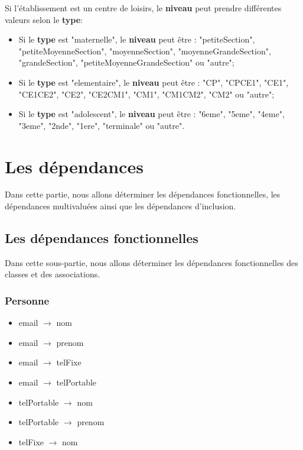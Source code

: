 \documentclass[asi, sansVersion]{picInsa}
\begin{document}
Si l'établissement est un centre de loisirs, le \textbf{niveau} peut prendre différentes valeurs selon le \textbf{type}:
\begin{itemize}
\item Si le \textbf{type} est "maternelle", le \textbf{niveau} peut être : "petiteSection", "petiteMoyenneSection", "moyenneSection", "moyenneGrandeSection", "grandeSection", "petiteMoyenneGrandeSection" ou "autre";
\item Si le \textbf{type} est "elementaire", le \textbf{niveau} peut être : "CP", "CPCE1", "CE1", "CE1CE2", "CE2", "CE2CM1", "CM1", "CM1CM2", "CM2" ou "autre";
\item Si le \textbf{type} est "adolescent", le \textbf{niveau} peut être : "6eme", "5eme", "4eme", "3eme", "2nde", "1ere", "terminale" ou "autre". 
\end{itemize}
  

\chapter{Les dépendances}

Dans cette partie, nous allons déterminer les dépendances fonctionnelles, les dépendances multivaluées ainsi que les dépendances d'inclusion. \\

\section{Les dépendances fonctionnelles}

Dans cette sous-partie, nous allons déterminer les dépendances fonctionnelles des classes et des associations.  

\subsection*{Personne}
\begin{itemize}
\item[] email $\rightarrow$ nom 
\item[] email $\rightarrow$ prenom 
\item[] email $\rightarrow$ telFixe 
\item[] email $\rightarrow$ telPortable 
\item[] telPortable $\rightarrow$ nom
\item[] telPortable $\rightarrow$ prenom
\item[] telFixe $\rightarrow$ nom
\end{itemize}
\end{document}
